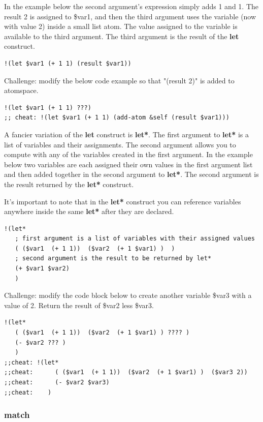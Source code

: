 \documentclass{article}
\begin{document}
In the example below the second argument's expression simply adds 1 and 1. The result 2 is assigned to \$var1, and then the third argument uses the variable (now with value 2) inside a small list atom. The value assigned to the variable is available to the third argument. The third argument is the result of the \textbf{let} construct.

\begin{verbatim}
!(let $var1 (+ 1 1) (result $var1))
\end{verbatim}

Challenge: modify the below code example so that "(result 2)" is added to atomspace.

\begin{verbatim}
!(let $var1 (+ 1 1) ???)
;; cheat: !(let $var1 (+ 1 1) (add-atom &self (result $var1)))
\end{verbatim}

A fancier variation of the \textbf{let} construct is \textbf{let*}. The first argument to \textbf{let*} is a list of variables and their assignments. The second argument allows you to compute with any of the variables created in the first argument. In the example below two variables are each assigned their own values in the first argument list and then added together in the second argument to \textbf{let*}. The second argument is the result returned by the \textbf{let*} construct.

It's important to note that in the \textbf{let*} construct you can reference variables anywhere inside the same \textbf{let*} after they are declared.

\begin{verbatim}
!(let*
   ; first argument is a list of variables with their assigned values
   ( ($var1  (+ 1 1))  ($var2  (+ 1 $var1) )  )
   ; second argument is the result to be returned by let*
   (+ $var1 $var2)
   )  
\end{verbatim}

Challenge: modify the code block below to create another variable \$var3 with a value of 2. Return the result of \$var2 less \$var3.

\begin{verbatim}
!(let*
   ( ($var1  (+ 1 1))  ($var2  (+ 1 $var1) ) ???? )
   (- $var2 ??? )
   )  
;;cheat: !(let*
;;cheat:      ( ($var1  (+ 1 1))  ($var2  (+ 1 $var1) )  ($var3 2))
;;cheat:      (- $var2 $var3)
;;cheat:    )  
\end{verbatim}

\subsubsection{match}
\end{document}
